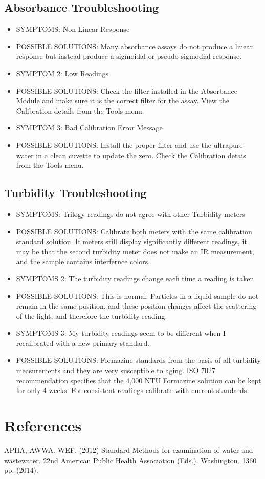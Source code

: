 \documentclass[12pt]{../SOP4_alpha}\usepackage[]{graphicx}\usepackage[]{color}
\begin{document}
\subsection{Absorbance Troubleshooting}
\begin{itemize}
  \item SYMPTOMS: Non-Linear Response
  \item POSSIBLE SOLUTIONS: Many absorbance assays do not produce a linear response but instead produce a sigmoidal or pseudo-sigmodial response. 
  \item SYMPTOM 2: Low Readings
  \item POSSIBLE SOLUTIONS: Check the filter installed in the Absorbance Module and make sure it is the correct filter for the assay. View the Calibration details from the Tools menu.
  \item SYMPTOM 3: Bad Calibration Error Message
  \item POSSIBLE SOLUTIONS: Install the proper filter and use the ultrapure water in a clean cuvette to update the zero. Check the Calibration detais from the Tools menu. 
\end{itemize}

\subsection{Turbidity Troubleshooting}
\begin{itemize}
  \item SYMPTOMS: Trilogy readings do not agree with other Turbidity meters
  \item POSSIBLE SOLUTIONS: Calibrate both meters with the same calibration standard solution. If meters still display significantly different readings, it may be that the second turbidity meter does not make an IR measurement, and the sample contains interfernce colors. 
  \item SYMPTOMS 2: The turbidity readings change each time a reading is taken
  \item POSSIBLE SOLUTIONS: This is normal. Particles in a liquid sample do not remain in the same position, and these position changes affect the scattering of the light, and therefore the turbidity reading. 
  \item SYMPTOMS 3: My turbidity readings seem to be different when I recalibrated with a new primary standard.
  \item POSSIBLE SOLUTIONS: Formazine standards from the basis of all turbidity measurements and they are very susceptible to aging. ISO 7027 recommendation specifies that the 4,000 NTU Formazine solution can be kept for only 4 weeks. For consistent readings calibrate with current standards. 
\end{itemize}

\section{References}

\NP APHA, AWWA. WEF. (2012) Standard Methods for examination of water and wastewater. 22nd American Public Health Association (Eds.). Washington. 1360 pp. (2014).
\end{document}

